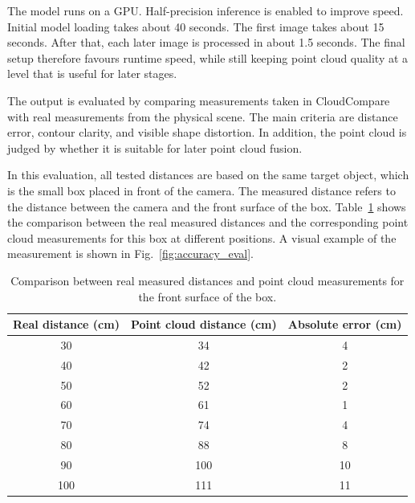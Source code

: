 \documentclass{article}
\begin{document}
The model runs on a GPU. Half-precision inference is enabled to improve speed. Initial model loading takes about 40 seconds. The first image takes about 15 seconds. After that, each later image is processed in about 1.5 seconds. The final setup therefore favours runtime speed, while still keeping point cloud quality at a level that is useful for later stages.

The output is evaluated by comparing measurements taken in CloudCompare with real measurements from the physical scene. The main criteria are distance error, contour clarity, and visible shape distortion. In addition, the point cloud is judged by whether it is suitable for later point cloud fusion.

In this evaluation, all tested distances are based on the same target object, which is the small box placed in front of the camera. The measured distance refers to the distance between the camera and the front surface of the box. Table~\ref{tab:distance_accuracy} shows the comparison between the real measured distances and the corresponding point cloud measurements for this box at different positions. A visual example of the measurement is shown in Fig.~\ref{fig:accuracy_eval}.

\begin{table}[htbp]
    \centering
    \caption{Comparison between real measured distances and point cloud measurements for the front surface of the box.}
    \label{tab:distance_accuracy}
    \begin{tabular}{|c|c|c|}
        \hline
        Real distance (cm) & Point cloud distance (cm) & Absolute error (cm) \\
        \hline
        30  & 34  & 4  \\
        40  & 42  & 2  \\
        50  & 52  & 2  \\
        60  & 61  & 1  \\
        70  & 74  & 4  \\
        80  & 88  & 8  \\
        90  & 100 & 10 \\
        100 & 111 & 11 \\
        \hline
    \end{tabular}
\end{table}
\end{document}
